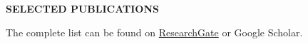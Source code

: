 %
%
%
%
%

\vspace{\spaceBeforeSection}
\textbf{SELECTED PUBLICATIONS} \hrulefill
\vspace{\spaceAfterSection}

\nocite{*} %

\printbibliography[heading=none, keyword={cv_selected}] %

The complete list can be found on \href{https://www.researchgate.net/profile/Winnie-The-Pooh/research}{ResearchGate} or Google Scholar. 
